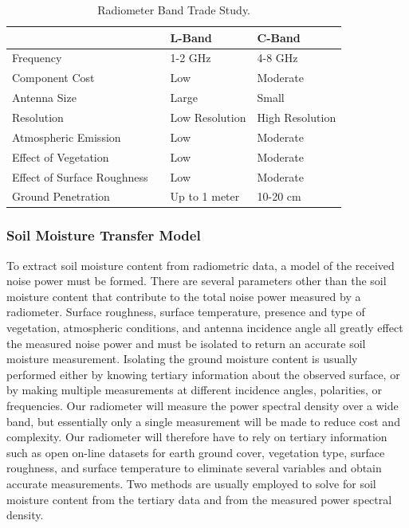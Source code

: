 \documentclass[12pt]{article}
\begin{document}
\begin{table}[!h]
	\centering
	\vspace{0.5cm}
	\renewcommand{\arraystretch}{1.3}
	\caption{Radiometer Band Trade Study. }
	\label{tab:band_trade}
	\begin{tabularx}{\textwidth}{lXll}
		\toprule
									& & L-Band & C-Band \\		
		\midrule
		Frequency					& &1-2 GHz&4-8 GHz \\ 
		Component Cost				& &Low&Moderate	 \\
		Antenna Size 				& &Large&Small	 \\
		Resolution 					& &Low Resolution&High Resolution 	\\ 
		Atmospheric Emission		& &Low&Moderate 					\\ 
		Effect of Vegetation		& &Low&Moderate						\\
		Effect of Surface Roughness	& &Low&Moderate						\\
		Ground Penetration			& &Up to 1 meter&10-20 cm			\\
	\end{tabularx}
\end{table}

\subsubsection{Soil Moisture Transfer Model}

To extract soil moisture content from radiometric data, a model of the received noise power must be formed. There are several parameters other than the soil moisture content that contribute to the total noise power measured by a radiometer. Surface roughness, surface temperature, presence and type of vegetation, atmospheric conditions, and antenna incidence angle all greatly effect the measured noise power and must be isolated to return an accurate soil moisture measurement. Isolating the ground moisture content is usually performed either by knowing tertiary information about the observed surface, or by making multiple measurements at different incidence angles, polarities, or frequencies. Our radiometer will measure the power spectral density over a wide band, but essentially only a single measurement will be made to reduce cost and complexity. Our radiometer will therefore have to rely on tertiary information such as open on-line datasets for earth ground cover, vegetation type, surface roughness, and surface temperature to eliminate several variables and obtain accurate measurements. Two methods are usually employed to solve for soil moisture content from the tertiary data and from the measured power spectral density.
\end{document}

